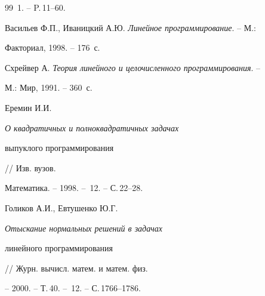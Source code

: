\begin{thebibliography}{99}
\No\,1. -- P.\,11--60.




Васильев Ф.П., Иваницкий А.Ю. {\em Линейное программирование}. -- М.:


Факториал, 1998. -- 176~с.




Схрейвер А. {\em Теория линейного и целочисленного программирования}. --


М.: Мир, 1991. -- 360~с.




Еремин И.И. {\em О квадратичных и полноквадратичных задачах


выпуклого программирования} // Изв. вузов.


Математика. -- 1998. -- \No\,12. -- С.\,22--28.




Голиков А.И., Евтушенко Ю.Г. {\em Отыскание нормальных решений в задачах


линейного программирования} // Журн. вычисл. матем. и матем. физ.


-- 2000. -- Т.\,40. -- \No\,12. -- С.\,1766--1786.





\end{thebibliography}





\vskip 1cm












\label{end}











